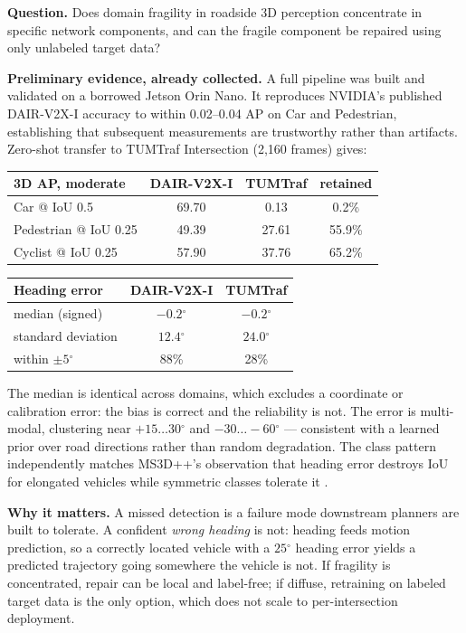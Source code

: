 \documentclass[10pt,letterpaper]{article}
\newcommand{\dg}{\ensuremath{^\circ}}
\begin{document}
\textbf{Question.} Does domain fragility in roadside 3D perception concentrate in specific
network components, and can the fragile component be repaired using only unlabeled target data?

\textbf{Preliminary evidence, already collected.} A full pipeline was built and validated on a
borrowed Jetson Orin Nano. It reproduces NVIDIA's published DAIR-V2X-I accuracy
\cite{dair,nvidia} to within 0.02--0.04 AP on Car and Pedestrian, establishing that subsequent
measurements are trustworthy rather than artifacts. Zero-shot transfer to TUMTraf Intersection
\cite{tumtraf} (2,160 frames) gives:

\begin{center}\small
\begin{tabular}{@{}lccc@{}}
\toprule
\textbf{3D AP, moderate} & \textbf{DAIR-V2X-I} & \textbf{TUMTraf} & \textbf{retained} \\
\midrule
Car @ IoU 0.5          & 69.70 & 0.13  & 0.2\%  \\
Pedestrian @ IoU 0.25  & 49.39 & 27.61 & 55.9\% \\
Cyclist @ IoU 0.25     & 57.90 & 37.76 & 65.2\% \\
\bottomrule
\end{tabular}
\hfill
\begin{tabular}{@{}lcc@{}}
\toprule
\textbf{Heading error} & \textbf{DAIR-V2X-I} & \textbf{TUMTraf} \\
\midrule
median (signed)    & $-0.2\dg$ & $-0.2\dg$ \\
standard deviation & $12.4\dg$ & $24.0\dg$ \\
within $\pm 5\dg$  & 88\%      & 28\%      \\
\bottomrule
\end{tabular}
\end{center}

The median is identical across domains, which excludes a coordinate or calibration error: the
bias is correct and the reliability is not. The error is multi-modal, clustering near
$+15\ldots30\dg$ and $-30\ldots-60\dg$ --- consistent with a learned prior over road directions
rather than random degradation. The class pattern independently matches MS3D++'s observation
that heading error destroys IoU for elongated vehicles while symmetric classes tolerate it
\cite{ms3d}.

\textbf{Why it matters.} A missed detection is a failure mode downstream planners are built to
tolerate. A confident \emph{wrong heading} is not: heading feeds motion prediction, so a
correctly located vehicle with a $25\dg$ heading error yields a predicted trajectory going
somewhere the vehicle is not. If fragility is concentrated, repair can be local and label-free;
if diffuse, retraining on labeled target data is the only option, which does not scale to
per-intersection deployment.
\end{document}
